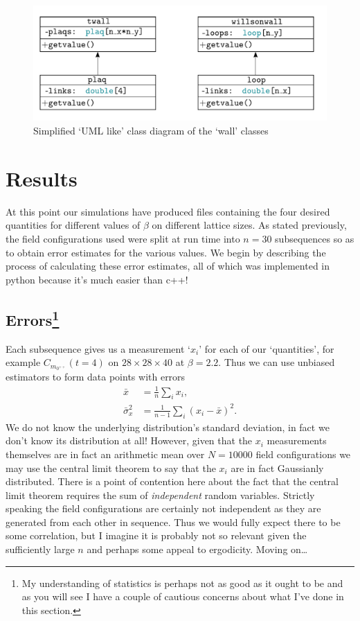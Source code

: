 \documentclass[12pt]{article}
\begin{document}
\begin{figure}
\centering
\includegraphics[width=0.8\linewidth]{wallclasses.pdf}
\caption{\label{fig:wallclasses} Simplified `UML like' class diagram of the `wall' classes}
\end{figure}

\section{Results}
At this point our simulations have produced files containing the four desired quantities for different values of $\beta$ on different lattice sizes. As stated previously, the field configurations used were split at run time into $n=30$ subsequences so as to obtain error estimates for the various values. We begin by describing the process of calculating these error estimates, all of which was implemented in python because it's much easier than c++!

\subsection{Errors\protect\footnote{My understanding of statistics is perhaps not as good as it ought to be and as you will see I have a couple of cautious concerns about what I've done in this section.}}
Each subsequence gives us a measurement `$x_i$' for each of our `quantities', for example $C_{m_{0^{++}}}(t=4)$ on $28\times 28 \times 40$ at $\beta = 2.2$. Thus we can use unbiased estimators to form data points with errors
\begin{align}
    \bar{x} &= \frac{1}{n}\sum_{i} x_i,\\
    \bar{\sigma}_{x}^2 &= \frac{1}{n-1}\sum_{i} (x_i - \bar{x})^2.
\end{align}
We do not know the underlying distribution's standard deviation, in fact we don't know its distribution at all! However, given that the $x_i$ measurements themselves are in fact an arithmetic mean over $N=10000$ field configurations we may use the central limit theorem to say that the $x_i$ are in fact Gaussianly distributed. There is a point of contention here about the fact that the central limit theorem requires the sum of \emph{independent} random variables. Strictly speaking the field configurations are certainly not independent as they are generated from each other in sequence. Thus we would fully expect there to be some correlation, but I imagine it is probably not so relevant given the sufficiently large $n$ and perhaps some appeal to ergodicity. Moving on\ldots
\end{document}
